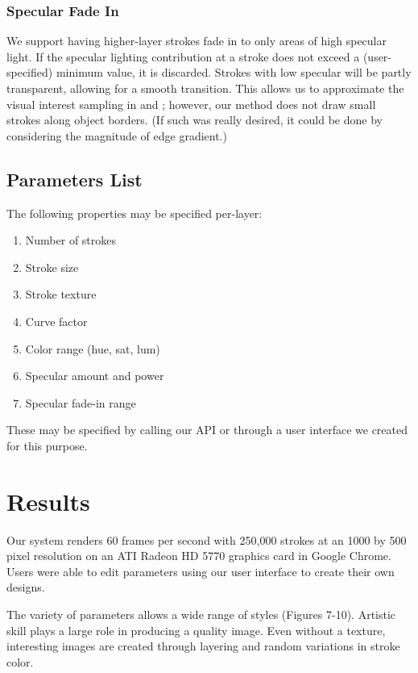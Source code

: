 \documentclass[conference]{acmsiggraph}
\begin{document}
\subsubsection{Specular Fade In}

We support having higher-layer strokes fade in to only areas of high specular
light. If the specular lighting contribution at a stroke does not exceed a
(user-specified) minimum value, it is discarded. Strokes with low specular will
be partly transparent, allowing for a smooth transition. This allows us to
approximate the visual interest sampling in
\cite{Hertzmann:1998:PRC:280814.280951} and \cite{Lu:2010:IPS:1730804.1730825};
however, our method does not draw small strokes along object borders. (If such
was really desired, it could be done by considering the magnitude of edge
gradient.)


\subsection{Parameters List}

The following properties may be specified per-layer:

\begin{enumerate}
  \item Number of strokes
  \item Stroke size
  \item Stroke texture
  \item Curve factor
  \item Color range (hue, sat, lum)
  \item Specular amount and power
  \item Specular fade-in range
\end{enumerate}

These may be specified by calling our API or through a user interface we
created for this purpose.


\section{Results}

Our system renders 60 frames per second with 250,000 strokes at an 1000 by 500
pixel resolution on an ATI Radeon HD 5770 graphics card in Google Chrome. Users
were able to edit parameters using our user interface to create their own
designs.

The variety of parameters allows a wide range of styles (Figures 7-10).
Artistic skill plays a large role in producing a quality image. Even without a texture, interesting images are created through layering and random variations
in stroke color.
\end{document}
